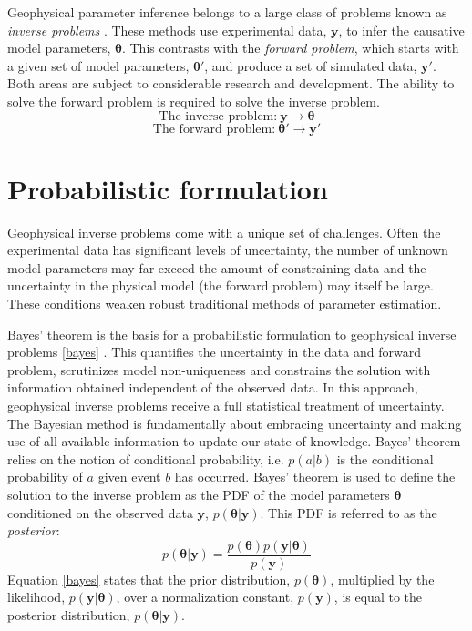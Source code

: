 Geophysical parameter inference belongs to a large class of problems known as \textit{inverse problems} \citep{Tarantola2005,Aster2013,Menke2012}. These methods use experimental data, $\bm{y}$, to infer the causative model parameters, $\bm{\theta}$. This contrasts with the \textit{forward problem}, which starts with a given set of model parameters, $\bm{\theta'}$, and produce a set of simulated data, $\bm{y'}$. Both areas are subject to considerable research and development. The ability to solve the forward problem is required to solve the inverse problem.
\begin{equation}
\text{The inverse problem:}\ \bm{y} \rightarrow \bm{\theta}
\label{inverse_problem}
\end{equation}
\begin{equation}
\text{The forward problem:}\ \bm{\theta'} \rightarrow \bm{y'}
\label{forward_problem}
\end{equation}


\section{Probabilistic formulation}

Geophysical inverse problems come with a unique set of challenges. Often the experimental data has significant levels of uncertainty, the number of unknown model parameters may far exceed the amount of constraining data and the uncertainty in the physical model (the forward problem) may itself be large. These conditions weaken robust traditional methods of parameter estimation.\par

Bayes' theorem is the basis for a probabilistic formulation to geophysical inverse problems \ref{bayes} \citep{Tarantola1982a,Mosegaard1995,Mosegaard2002,Tarantola2005}. This quantifies the uncertainty in the data and forward problem, scrutinizes model non-uniqueness and constrains the solution with information obtained independent of the observed data. In this approach, geophysical inverse problems receive a full statistical treatment of uncertainty. The Bayesian method is fundamentally about embracing uncertainty and making use of all available information to update our state of knowledge. Bayes' theorem relies on the notion of conditional probability, i.e. $p(a|b)$ is the conditional probability of $a$ given event $b$ has occurred. Bayes' theorem is used to define the solution to the inverse problem as the PDF of the model parameters $\bm{\theta}$ conditioned on the observed data $\bm{y}$, $p(\bm{\theta}|\bm{y})$. This PDF is referred to as the \textit{posterior}:
\begin{equation}
p(\bm{\theta}|\bm{y}) = \frac{p(\bm{\theta}) p(\bm{y}|\bm{\theta})}{p(\bm{y})}
\label{bayes}
\end{equation}
Equation \ref{bayes} states that the prior distribution, $p(\bm{\theta})$, multiplied by the likelihood, $p(\bm{y}|\bm{\theta})$, over a normalization constant, $p(\bm{y})$, is equal to the posterior distribution, $p(\bm{\theta}|\bm{y})$.\par

